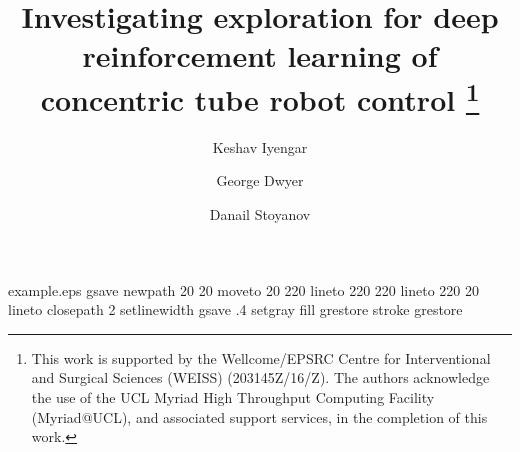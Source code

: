 %
%
%
%
%
\begin{filecontents*}{example.eps}
gsave
newpath
  20 20 moveto
  20 220 lineto
  220 220 lineto
  220 20 lineto
closepath
2 setlinewidth
gsave
  .4 setgray fill
grestore
stroke
grestore
\end{filecontents*}
%
\RequirePackage{fix-cm}
%
\documentclass{svjour3}                     %
%
\smartqed  %
%
\usepackage{graphicx}
%
%
\usepackage{amsmath}
\usepackage{subfig}

%
%
%


\title{Investigating exploration for deep reinforcement learning of concentric tube robot control
\thanks{This work is supported by the Wellcome/EPSRC Centre for Interventional and Surgical Sciences (WEISS) (203145Z/16/Z). The authors acknowledge the use of the UCL Myriad High Throughput Computing Facility (Myriad@UCL), and associated support services, in the completion of this work.}
}


\author{Keshav Iyengar \and
        George Dwyer \and Danail Stoyanov
}

